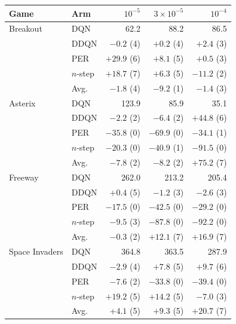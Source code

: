 \begin{tabular}{@{}llrrr@{}}
\toprule
Game & Arm & $10^{-5}$ & $3{\times}10^{-5}$ & $10^{-4}$ \\
\midrule
Breakout & DQN & 62.2 & 88.2 & 86.5 \\
 & DDQN & $-0.2$ (4) & $+0.2$ (4) & $+2.4$ (3) \\
 & PER & $+29.9$ (6) & $+8.1$ (5) & $+0.5$ (3) \\
 & $n$-step & $+18.7$ (7) & $+6.3$ (5) & $-11.2$ (2) \\
 & Avg. & $-1.8$ (4) & $-9.2$ (1) & $-1.4$ (3) \\
\midrule
Asterix & DQN & 123.9 & 85.9 & 35.1 \\
 & DDQN & $-2.2$ (2) & $-6.4$ (2) & $+44.8$ (6) \\
 & PER & $-35.8$ (0) & $-69.9$ (0) & $-34.1$ (1) \\
 & $n$-step & $-20.3$ (0) & $-40.9$ (1) & $-91.5$ (0) \\
 & Avg. & $-7.8$ (2) & $-8.2$ (2) & $+75.2$ (7) \\
\midrule
Freeway & DQN & 262.0 & 213.2 & 205.4 \\
 & DDQN & $+0.4$ (5) & $-1.2$ (3) & $-2.6$ (3) \\
 & PER & $-17.5$ (0) & $-42.5$ (0) & $-29.2$ (0) \\
 & $n$-step & $-9.5$ (3) & $-87.8$ (0) & $-92.2$ (0) \\
 & Avg. & $-0.3$ (2) & $+12.1$ (7) & $+16.9$ (7) \\
\midrule
Space Invaders & DQN & 364.8 & 363.5 & 287.9 \\
 & DDQN & $-2.9$ (4) & $+7.8$ (5) & $+9.7$ (6) \\
 & PER & $-7.6$ (2) & $-33.8$ (0) & $-39.4$ (0) \\
 & $n$-step & $+19.2$ (5) & $+14.2$ (5) & $-7.0$ (3) \\
 & Avg. & $+4.1$ (5) & $+9.3$ (5) & $+20.7$ (7) \\
\bottomrule
\end{tabular}
